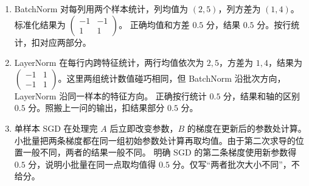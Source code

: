\begin{enumerate}[label=(\arabic*)]
\begin{align*}
\bm{c}'&=\bm{c}-(-2,-3,5)^{\mathsf T}/140.
\end{align*}
隐藏层与输出层各 $0.5$ 分。漏加 $b$ 的旧动量，扣隐藏层部分 $0.5$ 分。
\item BatchNorm 对每列用两个样本统计，列均值为 $(2,5)$，列方差为 $(1,4)$。标准化结果为 $\begin{pmatrix}-1&-1\\1&1\end{pmatrix}$。
正确均值和方差 $0.5$ 分，结果 $0.5$ 分。按行统计，扣对应两部分。
\item LayerNorm 在每行内跨特征统计，两行均值依次为 $2,5$，方差为 $1,4$，结果为 $\begin{pmatrix}-1&1\\-1&1\end{pmatrix}$。这里两组统计数值碰巧相同，但 BatchNorm 沿批次方向，LayerNorm 沿同一样本的特征方向。
正确按行统计 $0.5$ 分，结果和轴的区别 $0.5$ 分。照搬上一问的输出，扣结果部分 $0.5$ 分。
\item 单样本 SGD 在处理完 $A$ 后立即改变参数，$B$ 的梯度在更新后的参数处计算。小批量把两条梯度都在同一组初始参数处计算再取均值。由于第二次求导的位置一般不同，两者的结果一般不同。
明确 SGD 的第二条梯度使用新参数得 $0.5$ 分，说明小批量在同一点取均值得 $0.5$ 分。仅写“两者批次大小不同”，不给分。
\end{enumerate}

